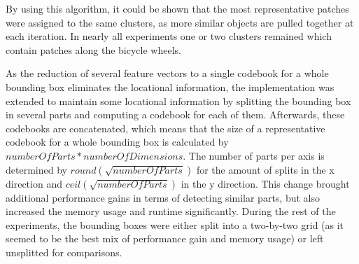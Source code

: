 By using this algorithm, it could be shown that the most representative patches were assigned to the same clusters, as more similar objects are pulled together at each iteration. In nearly all experiments one or two clusters remained which contain patches along the bicycle wheels.

\par
As the reduction of several feature vectors to a single codebook for a whole bounding box eliminates the locational information, the implementation was extended to maintain some locational information by splitting the bounding box in several parts and computing a codebook for each of them. Afterwards, these codebooks are concatenated, which means that the size of a representative codebook for a whole bounding box is calculated by $numberOfParts * numberOfDimensions$. The number of parts per axis is determined by $round(\sqrt{numberOfParts})$ for the amount of splits in the x direction and $ceil(\sqrt{numberOfParts})$ in the y direction. This change brought additional performance gains in terms of detecting similar parts, but also increased the memory usage and runtime significantly. During the rest of the experiments, the bounding boxes were either split into a two-by-two grid (as it seemed to be the best mix of performance gain and memory usage) or left unsplitted for comparisons.
